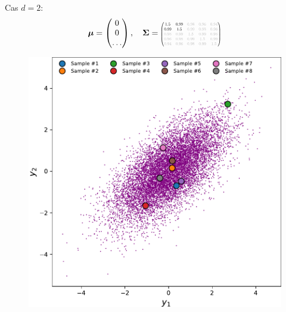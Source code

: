 \documentclass[xcolor=svgnames, t]{beamer}
\newcommand{\vectorx}[1]{\boldsymbol{\MakeLowercase{\mathbf{#1}}}}
\newcommand{\matrixx}[1]{\boldsymbol{\MakeUppercase{#1}}}
\newcommand{\scalemath}[2]{\scalebox{#1}{\mbox{\ensuremath{\displaystyle #2}}}}
\begin{document}
\begin{frame}{\subsecname}
  Cas $d=2$:
  \begin{equation*}
    \vectorx{\mu}
    =
    \begin{pmatrix}
      0 \\
      0 \\
      \dots
    \end{pmatrix},
    \quad
    \matrixx{\Sigma}
    =
    \scalemath{0.5}{
      \begin{pmatrix}
        1.5 & 0.99 & \color{lightgray}0.98 & \color{lightgray}0.96 & \color{lightgray}0.94 \\
        0.99 & 1.5 & \color{lightgray}0.99 & \color{lightgray}0.98 & \color{lightgray}0.96 \\
        \color{lightgray}0.98 & \color{lightgray}0.99 & \color{lightgray}1.5 & \color{lightgray}0.99 & \color{lightgray}0.98 \\
        \color{lightgray}0.96 & \color{lightgray}0.98 & \color{lightgray}0.99 & \color{lightgray}1.5 & \color{lightgray}0.99 \\
        \color{lightgray}0.94 & \color{lightgray}0.96 & \color{lightgray}0.98 & \color{lightgray}0.99 & \color{lightgray}1.5
        \end{pmatrix}
    }
  \end{equation*}
  \begin{figure}[ht]
    \includegraphics[scale=0.3]{gaussian_2d_2outof5.pdf}

\end{figure}
\end{frame}
\end{document}
